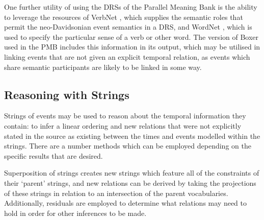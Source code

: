 \documentclass[a4paper,12pt,leqno,twoside]{article}
\begin{document}
One further utility of using the DRSs of the Parallel Meaning Bank is the ability to leverage the resources of VerbNet \citep{schuler2005verbnet}, which supplies the semantic roles that permit the neo-Davidsonian event semantics in a DRS, and WordNet \citep{fellbaum2010wordnet}, which is used to specify the particular sense of a verb or other word. The version of Boxer used in the PMB includes this information in its output, which may be utilised in linking events that are not given an explicit temporal relation, as events which share semantic participants are likely to be linked in some way.



\subsection{Reasoning with Strings}\label{sub:reasoning}
Strings of events may be used to reason about the temporal information they contain: to infer a linear ordering and new relations that were not explicitly stated in the source as existing between the times and events modelled within the strings. There are a number methods which can be employed depending on the specific results that are desired.

Superposition of strings creates new strings which feature all of the constraints of their `parent' strings, and new relations can be derived by taking the projections of these strings in relation to an intersection of the parent vocabularies. %
Additionally, residuals are employed to determine what relations may need to hold in order for other inferences to be made.
\end{document}

